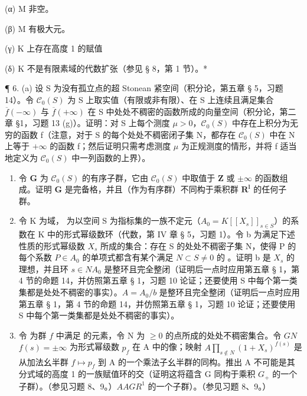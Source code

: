 (α) M 非空。

(β) M 有极大元。

(γ) K 上存在高度 1 的赋值

(δ) K 不是有限素域的代数扩张（参见 § 8，第 1 节）。*

¶ 6. (a) 设 S 为没有孤立点的超 Stonean 紧空间（积分论，第五章 § 5，习题 14）。令 \(\mathcal{C}_{0}(S)\) 为 S 上取实值（有限或非有限）、在 S 上连续且满足集合 \(\overline{f}(-\infty)\) 与 \(\overline{f}(+\infty)\) 在 S 中处处不稠密的函数所成的向量空间（积分论，第二章 §1，习题 13 (g)）。证明：对 S 上每个测度 \(\mu > 0\)，\(\mathcal{C}_{0}(S)\) 中存在上积分为无穷的函数 f（注意，对于 S 的每个处处不稠密闭子集 N，都存在 \(\mathcal{C}_{0}(S)\) 中在 N 上等于 \(+\infty\) 的函数 f；然后证明只需考虑测度 \(\mu\) 为正规测度的情形，并将 f 适当地定义为 \(\mathcal{C}_{0}(S)\) 中一列函数的上界）。

\begin{enumerate}
\def\labelenumi{(\alph{enumi})}
\setcounter{enumi}{1}
\item
  令 \(\mathbf{G}\) 为 \(\mathcal{C}_0(S)\) 的有序子群，它由 \(\mathcal{C}_0(S)\) 中取值于 \(\mathbf{Z}\) 或 \(\pm \infty\) 的函数组成。证明 \(\mathbf{G}\) 是完备格，并且（作为有序群）不同构于乘积群 \(\mathbf{R}^{\mathbf{l}}\) 的任何子群。
\item
  令 K 为域， 为以空间 S 为指标集的一族不定元（\(A_{0} = K[[X_{s}]]_{s \in S}\)）的系数在 K 中的形式幂级数环（代数，第 IV 章 § 5，习题 1）。令 b 为满足下述性质的形式幂级数 \(X_{s}\) 所成的集合：存在 S 的处处不稠密子集 N，使得 P 的每个系数 \(P \in A_{0}\) 的单项式都含有某个满足 \(N \subset S\)\(\neq 0\) 的 。证明 b 是 \(X_{s}\) 的理想，并且环 \(s \in N\)\(A_{0}\) 是整环且完全整闭（证明后一点时应用第五章 § 1，第 4 节的命题 14，并仿照第五章 § 1，习题 10 论证；还要使用 S 中每个第一类集都是处处不稠密的事实）。\(A = A_{0}/b\) 是整环且完全整闭（证明后一点时应用第五章 § 1，第 4 节的命题 14，并仿照第五章 § 1，习题 10 论证；还要使用 S 中每个第一类集都是处处不稠密的事实）。
\item
  令  为群 \(f\) 中满足  的元素，令 N 为 \(\geqslant 0\) 的点所成的处处不稠密集合。令 \(G\)\(N\)\(f(s) = \pm \infty\) 为形式幂级数 \(p_f\) 在 A 中的像；映射 \(A\)\(\prod_{s \notin N} (1 + X_s)^{f(s)}\) 是从加法幺半群 \(f \mapsto p_f\) 到 A 的一个乘法子幺半群的同构。推出 A 不可能是其分式域的高度 1 的一族赋值环的交（证明这将蕴含 G 同构于乘积 \(G_+\) 的一个子群）。（参见习题 8、9。）\(A\)\(A\)\(G\)\(R^1\) 的一个子群）。（参见习题 8、9。）
\end{enumerate}

